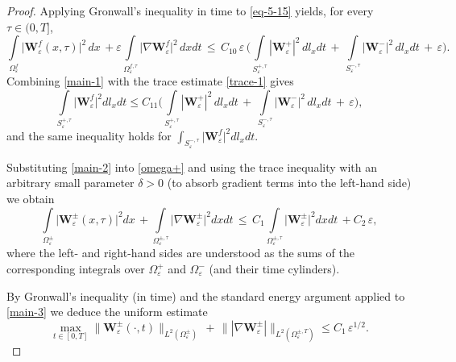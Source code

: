 \documentclass[reqno]{amsart}            %
\numberwithin{equation}{section}
\begin{document}
\begin{proof}
		Applying  Gronwall's inequality in time to \eqref{eq-5-15} yields, for every \(\tau\in(0,T]\), 
		\begin{equation}\label{main-1}
			\int\limits_{\Omega_\varepsilon^f} \big|\mathbf{W}^f_\varepsilon(x,\tau)\big|^2 \, dx\,  + \varepsilon \int\limits_{\Omega_\varepsilon^{f, \tau}} \big|\nabla \mathbf{W}^f_\varepsilon\big|^2 \, dxdt \, \le \, C_{10} \, \varepsilon \, \bigg(\int\limits_{S_\varepsilon^{+, \tau}} |\mathbf{W}^+_\varepsilon|^2 \, dl_xdt \,+\, \int\limits_{S_\varepsilon^{-, \tau}} |\mathbf{W}^-_\varepsilon|^2 \, dl_xdt \,+\,  \varepsilon\bigg).
		\end{equation}  
		Combining \eqref{main-1} with the trace estimate \eqref{trace-1} gives
		\begin{equation}\label{main-2}
			\int\limits_{S_\varepsilon^{+, \tau}} \big|\mathbf{W}^f_\varepsilon\big|^2  dl_xdt	\le C_{11} 
			\bigg(\int\limits_{S_\varepsilon^{+, \tau}} |\mathbf{W}^+_\varepsilon|^2 \, dl_xdt \,+\, \int\limits_{S_\varepsilon^{-, \tau}} |\mathbf{W}^-_\varepsilon|^2 \, dl_xdt \,+\,  \varepsilon\bigg),
		\end{equation}
		and the same inequality holds for $\int_{S_\varepsilon^{-, \tau}} \big|\mathbf{W}^f_\varepsilon\big|^2  dl_xdt.$ 
		
		Substituting \eqref{main-2} into \eqref{omega+} and using the trace inequality with an arbitrary small parameter \(\delta>0\) (to absorb gradient terms into the left-hand side) we obtain
		\begin{equation}\label{main-3}
			\int\limits_{\Omega_\varepsilon^{\pm}} \big|\mathbf{W}^{\pm}_\varepsilon(x,\tau)\big|^2  dx\,  + \int\limits_{\Omega_\varepsilon^{\pm, \tau}} \big|\nabla \mathbf{W}^{\pm}_\varepsilon\big|^2  dxdt \, \le \, C_1\int\limits_{\Omega_\varepsilon^{\pm, \tau}} \big|\mathbf{W}^\pm_\varepsilon\big|^2  dxdt \,
			+ C_2 \, \varepsilon,
		\end{equation}
		where the left- and right-hand sides are understood as the sums of the corresponding integrals over \(\Omega_\varepsilon^+\) and \(\Omega_\varepsilon^-\) (and their time cylinders).
		
		By Gronwall's inequality (in time) and the standard energy argument applied to \eqref{main-3} we deduce the uniform estimate
		\begin{equation}\label{main-4}
			\max_{t\in [0,T]} \|\mathbf{W}^{\pm}_\varepsilon(\cdot,t)\|_{L^2(\Omega_\varepsilon^{\pm})} \, + \, 
			\||\nabla\mathbf{W}^{\pm}_\varepsilon|\|_{L^2(\Omega_\varepsilon^{\pm,T})} \le C_1 \, \varepsilon^{1/2}.
		\end{equation}
		

\end{proof}
\end{document}
